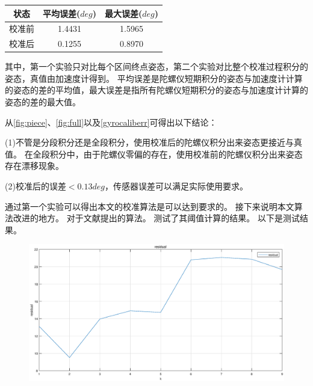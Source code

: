 \documentclass[
  type=master
]{gdutthesis}
\begin{document}
\begin{table}[h]
	\label{gyrocaliberr}
	\begin{tabular}{ccc}
		\toprule
		状态 & 平均误差($deg$) & 最大误差($deg$) \\
		\midrule
		校准前 & 1.4431 & 1.5965 \\
		校准后 & 0.1255 & 0.8970 \\
		\bottomrule
	\end{tabular}
\end{table}
其中，第一个实验只对比每个区间终点姿态，第二个实验对比整个校准过程积分的姿态，真值由加速度计得到。
平均误差是陀螺仪短期积分的姿态与加速度计计算的姿态的差的平均值，最大误差是指所有陀螺仪短期积分的姿态与加速度计计算的姿态的差的最大值。

从\autoref{fig:piece}、\autoref{fig:full}以及\autoref{gyrocaliberr}可得出以下结论：

(1)不管是分段积分还是全段积分，使用校准后的陀螺仪积分出来姿态更接近与真值。
在全段积分中，由于陀螺仪零偏的存在，使用校准前的陀螺仪积分出来姿态存在漂移现象。

(2)校准后的误差$<0.13deg$，传感器误差可以满足实际使用要求。

通过第一个实验可以得出本文的校准算法是可以达到要求的。
接下来说明本文算法改进的地方。
对于文献\parencite{tedaldi2014robust}提出的算法。
测试了其阈值计算的结果。
以下是测试结果。
\begin{figure}[htbp]
	\centering
	\includegraphics[width=1.0\textwidth]{res.eps}
	\label{fig:res}
\end{figure}
\end{document}
